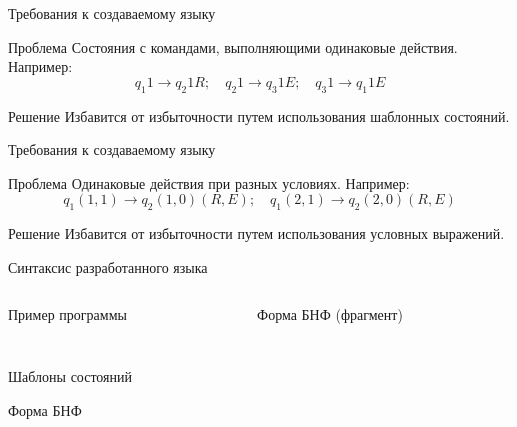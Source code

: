 \documentclass[14pt,pdf,hyperref={unicode}]{beamer}
\begin{document}
\begin{frame}{Требования к создаваемому языку}
	\begin{block}{Проблема}
		Состояния с командами, выполняющими одинаковые действия. Например:
		$$ q_1 1 \rightarrow q_2 1 R ; \quad q_2 1 \rightarrow q_3 1 E ; \quad q_3 1 \rightarrow q_1 1 E $$
	\end{block}
	
	\begin{block}{Решение}
		Избавится от избыточности путем использования шаблонных состояний.
	\end{block}
\end{frame}

\begin{frame}{Требования к создаваемому языку}
	\begin{block}{Проблема}
		Одинаковые действия при разных условиях. Например:
		$$
		q_1 (1,1) \rightarrow q_2 (1,0) (R,E) ; \quad q_1 (2,1) \rightarrow q_2 (2,0) (R,E)
		$$
	\end{block}
	
	\begin{block}{Решение}
		Избавится от избыточности путем использования условных выражений.
	\end{block}
\end{frame}

\begin{frame}{Синтаксис разработанного языка}
	\begin{columns}
		\begin{column}{5cm}
			Пример программы
			\inputminted[tabsize=2]{text}{../../examples/increment.mtr}
		\end{column}
		
		\begin{column}{7cm}
			Форма БНФ (фрагмент)
			\inputminted[fontsize=\scriptsize,tabsize=2,firstline=50]{bnf}{../article/bnf/turing.bnf}
		\end{column}
	\end{columns}
\end{frame}

\begin{frame}{Шаблоны состояний}
	\begin{block}{Форма БНФ}
		\inputminted[fontsize=\scriptsize,tabsize=2,firstline=8,lastline=10]{bnf}{../article/bnf/turing.bnf}
	\end{block}
	\inputminted[tabsize=2]{text}{syntax/template.txt}
\end{frame}
\end{document}

